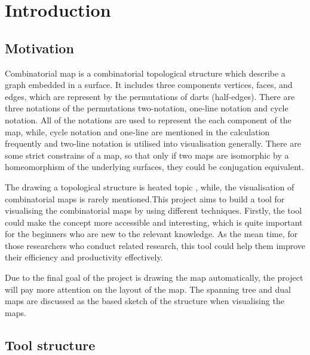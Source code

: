 
\chapter{Introduction}

\section{Motivation}

Combinatorial map is a combinatorial topological structure which describe a graph embedded in a surface. It includes three components vertices, faces, and edges, which are represent by the permutations of darts (half-edges). There are three notations of the permutations two-notation, one-line notation and cycle notation. All of the notations are used to represent the each component of the map, while, cycle notation and one-line are mentioned in the calculation frequently and two-line notation is utilised into visualisation generally. There are some strict constrains of a map, so that only if two maps are isomorphic by a homeomorphism of the underlying surfaces, they could be conjugation equivalent.

The drawing a topological structure is heated topic \cite{tamassia2013handbook}, while, the visualisation of combinatorial maps is rarely mentioned.This project aims to build a tool for visualising the combinatorial maps by using different techniques. Firstly, the tool could make the concept more accessible and interesting, which is quite important for the beginners who are new to the relevant knowledge. As the mean time, for those researchers who conduct related research, this tool could help them improve their efficiency and productivity effectively. 

Due to the final goal of the project is drawing the map automatically, the project will pay more attention on the layout of the map. The spanning tree and dual maps are discussed as the based sketch of the structure when visualising the maps.
%

\section{Tool structure}

